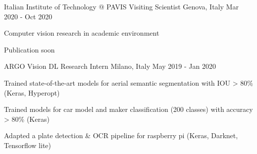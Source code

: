 

\begin{cventries}

  \cventry
  {Italian Institute of Technology @ PAVIS} %
  {Visiting Scientist } %
  {Genova, Italy} %
  {Mar 2020 - Oct 2020} %
  {
    \begin{cvitems} %
    \item Computer vision research in academic environment
    \item Publication soon
    \end{cvitems}
  }

  \cventry
  {ARGO Vision} %
  {DL Research Intern} %
  {Milano, Italy} %
  {May 2019 - Jan 2020} %
  {
    \begin{cvitems} %
    \item Trained state-of-the-art models for aerial semantic segmentation  with IOU > 80\% (Keras, Hyperopt)
    \item Trained models for car model and maker classification (200 classes) with accuracy > 80\%   (Keras)
    \item Adapted a plate detection \& OCR pipeline for raspberry pi (Keras, Darknet, Tensorflow lite)
    \end{cvitems}
  }


\end{cventries}
